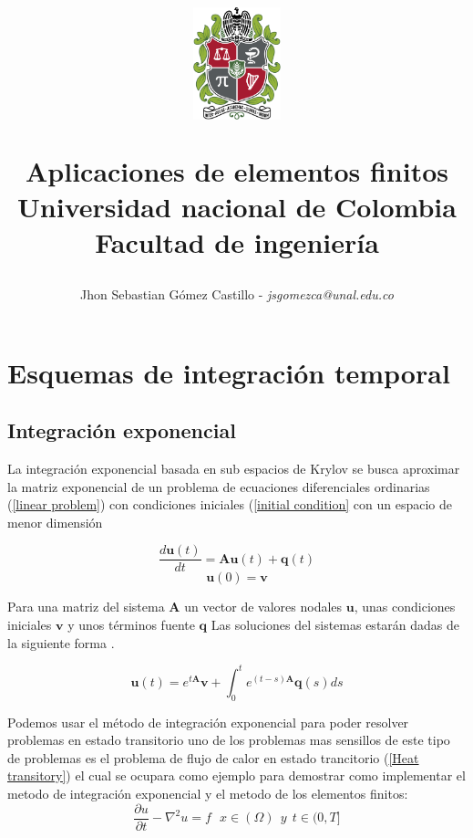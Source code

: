 \documentclass[12pt]{article}
\title{
	\vspace{-25mm}\begin{figure}[h]
		\centering
		\includegraphics[width=1in]{Escudo_de_la_Universidad_Nacional_de_Colombia.png}
		\label{escudo}
	\end{figure}
	Aplicaciones de elementos finitos\\
	\Large Universidad nacional de Colombia\\ 
	Facultad de ingeniería }
\author{Jhon Sebastian Gómez Castillo -
 \textit{jsgomezca@unal.edu.co}
}
\begin{document}
\maketitle
\section{Esquemas de integración temporal}  \label{esquemas}
\subsection{Integración exponencial}
La integración exponencial basada en sub espacios de Krylov se busca aproximar la matriz exponencial de un problema de ecuaciones diferenciales ordinarias (\ref{linear problem}) con condiciones iniciales (\ref{initial condition} con un espacio de menor dimensión 

\begin{equation}
	\frac{d \mathbf{u}(t)}{dt} = \mathbf{A} \mathbf{u}(t) + \mathbf{q}(t)
	\label{linear problem}
\end{equation}
\begin{equation}
	\mathbf{u}(0) = \mathbf{v}
	\label{initial condition}
\end{equation}

Para una matriz del sistema $\mathbf{A}$ un vector de valores nodales $\mathbf{u}$,  unas condiciones iniciales $\mathbf{v}$ y unos términos fuente $\mathbf{q}$ Las soluciones del sistemas estarán dadas de la siguiente forma \cite{schulze}.

\begin{equation}
	\mathbf{u}(t) = e ^{t \mathbf{A}} \mathbf{v} + \int_0 ^t e^{(t-s)\mathbf{A}} \mathbf{q}(s) ds
\end{equation}


Podemos usar el método de integración exponencial para poder resolver problemas en estado transitorio uno de los problemas mas sensillos de este tipo de problemas es el problema de flujo de calor en estado trancitorio (\ref{Heat transitory}) el cual se ocupara como ejemplo para demostrar como implementar el metodo de integración exponencial y el metodo de los elementos finitos:  \\


\begin{equation}
	\frac{\partial u}{\partial t}-\nabla^2 u =f  \ \ \ x \in (\Omega) \ \  y \ \ t \in (0,T]
	\label{Heat transitory}
\end{equation}
\end{document}
